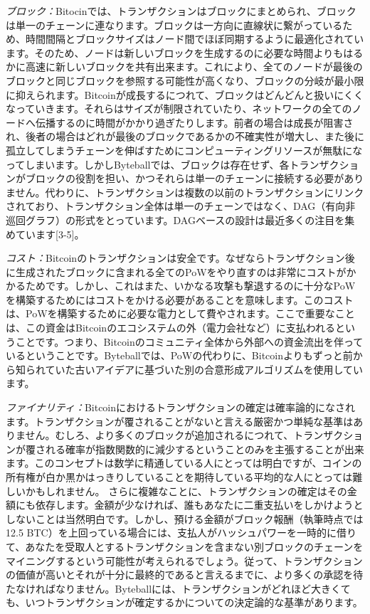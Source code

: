 \documentclass[a4paper, dvipdfmx]{jsarticle}
\begin{document}
{\em ブロック：}Bitocinでは、トランザクションはブロックにまとめられ、ブロックは単一のチェーンに連なります。ブロックは一方向に直線状に繋がっているため、時間間隔とブロックサイズはノード間でほぼ同期するように最適化されています。そのため、ノードは新しいブロックを生成するのに必要な時間よりもはるかに高速に新しいブロックを共有出来ます。これにより、全てのノードが最後のブロックと同じブロックを参照する可能性が高くなり、ブロックの分岐が最小限に抑えられます。Bitcoinが成長するにつれて、ブロックはどんどんと扱いにくくなっていきます。それらはサイズが制限されていたり、ネットワークの全てのノードへ伝播するのに時間がかかり過ぎたりします。前者の場合は成長が阻害され、後者の場合はどれが最後のブロックであるかの不確実性が増大し、また後に孤立してしまうチェーンを伸ばすためにコンピューティングリソースが無駄になってしまいます。しかしByteballでは、ブロックは存在せず、各トランザクションがブロックの役割を担い、かつそれらは単一のチェーンに接続する必要がありません。代わりに、トランザクションは複数の以前のトランザクションにリンクされており、トランザクション全体は単一のチェーンではなく、DAG（有向非巡回グラフ）の形式をとっています。DAGベースの設計は最近多くの注目を集めています[3-5]。

{\em コスト：}Bitcoinのトランザクションは安全です。なぜならトランザクション後に生成されたブロックに含まれる全てのPoWをやり直すのは非常にコストがかかるためです。しかし、これはまた、いかなる攻撃も撃退するのに十分なPoWを構築するためにはコストをかける必要があることを意味します。このコストは、PoWを構築するために必要な電力として費やされます。ここで重要なことは、この資金はBitcoinのエコシステムの外（電力会社など）に支払われるということです。つまり、Bitcoinのコミュニティ全体から外部への資金流出を伴っているということです。Byteballでは、PoWの代わりに、Bitcoinよりもずっと前から知られていた古いアイデアに基づいた別の合意形成アルゴリズムを使用しています。

{\em ファイナリティ：}Bitcoinにおけるトランザクションの確定は確率論的になされます。トランザクションが覆されることがないと言える厳密かつ単純な基準はありません。むしろ、より多くのブロックが追加されるにつれて、トランザクションが覆される確率が指数関数的に減少するということのみを主張することが出来ます。このコンセプトは数学に精通している人にとっては明白ですが、コインの所有権が白か黒かはっきりしていることを期待している平均的な人にとっては難しいかもしれません。 さらに複雑なことに、トランザクションの確定はその金額にも依存します。金額が少なければ、誰もあなたに二重支払いをしかけようとしないことは当然明白です。しかし、預ける金額がブロック報酬（執筆時点では12.5 BTC）を上回っている場合には、支払人がハッシュパワーを一時的に借りて、あなたを受取人とするトランザクションを含まない別ブロックのチェーンをマイニングするという可能性が考えられるでしょう。従って、トランザクションの価値が高いとそれが十分に最終的であると言えるまでに、より多くの承認を待たなければなりません。Byteballには、トランザクションがどれほど大きくても、いつトランザクションが確定するかについての決定論的な基準があります。
\end{document}
